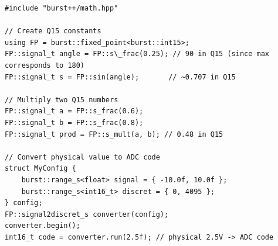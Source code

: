 \documentclass[a4paper,12pt]{article}
\begin{document}
\begin{lstlisting}[caption={Using fixed-point math}]
#include "burst++/math.hpp"

// Create Q15 constants
using FP = burst::fixed_point<burst::int15>;
FP::signal_t angle = FP::s\_frac(0.25); // 90 in Q15 (since max corresponds to 180)
FP::signal_t s = FP::sin(angle);       // ~0.707 in Q15

// Multiply two Q15 numbers
FP::signal_t a = FP::s_frac(0.6);
FP::signal_t b = FP::s_frac(0.8);
FP::signal_t prod = FP::s_mult(a, b); // 0.48 in Q15

// Convert physical value to ADC code
struct MyConfig {
    burst::range_s<float> signal = { -10.0f, 10.0f };
    burst::range_s<int16_t> discret = { 0, 4095 };
} config;
FP::signal2discret_s converter(config);
converter.begin();
int16_t code = converter.run(2.5f); // physical 2.5V -> ADC code
\end{lstlisting}
\end{document}
